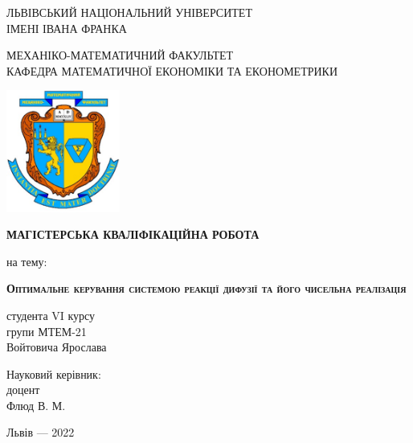 \documentclass[a4paper,12pt]{extreport}
\begin{document}
    \begin{titlepage}%
        \begin{center}
            {ЛЬВІВСЬКИЙ НАЦІОНАЛЬНИЙ УНІВЕРСИТЕТ \\ ІМЕНІ ІВАНА ФРАНКА}\par
            {МЕХАНІКО-МАТЕМАТИЧНИЙ ФАКУЛЬТЕТ \\ КАФЕДРА МАТЕМАТИЧНОЇ ЕКОНОМІКИ ТА ЕКОНОМЕТРИКИ}\par
            \begin{center}
            \includegraphics[height=4cm]{figures/title_mexmat.jpg}
            \end{center}
            \vspace{10mm}
            \bf{\small{МАГІСТЕРСЬКА КВАЛІФІКАЦІЙНА РОБОТА}}\par
        {\small{на тему:}}\par
            \vspace{20mm}
            {\LARGE{\bf{\scshape{Оптимальне керування системою реакції дифузії та його чисельна реалізація}}}}\par
            \vspace{5mm}
            {}\par %
        \end{center}
        \vfill
        \hfill
        \begin{flushright}
        \begin{minipage}[t]{80mm}
            \flushright
            студента VI курсу\\
            групи МТЕМ-21\\
            {Войтовича Ярослава}\par
            \vspace{2ex}
            Науковий керівник:\\
            {доцент}\\
            Флюд В. М.
        \end{minipage}
        \end{flushright}
        
        \begin{center}Львів --- 2022\end{center}
    \end{titlepage}
\tableofcontents
\newpage 
\end{document}
